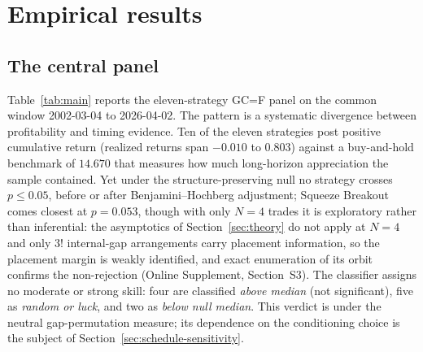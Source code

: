 \documentclass[risks,article,submit,pdftex,oneauthor]{Definitions/mdpi}
\begin{document}
\section{Empirical results}

\subsection{The central panel}

Table~\ref{tab:main} reports the eleven-strategy GC=F panel on the common window 2002-03-04 to 2026-04-02. The pattern is a systematic divergence between profitability and timing evidence. Ten of the eleven strategies post positive cumulative return (realized returns span $-0.010$ to $0.803$) against a buy-and-hold benchmark of $14.670$ that measures how much long-horizon appreciation the sample contained. Yet under the structure-preserving null no strategy crosses $p\le0.05$, before or after Benjamini--Hochberg adjustment; Squeeze Breakout comes closest at $p=0.053$, though with only $N=4$ trades it is exploratory rather than inferential: the asymptotics of Section~\ref{sec:theory} do not apply at $N=4$ and only $3!$ internal-gap arrangements carry placement information, so the placement margin is weakly identified, and exact enumeration of its orbit confirms the non-rejection (Online Supplement, Section~S3). The classifier assigns no moderate or strong skill: four are classified \emph{above median} (not significant), five as \emph{random or luck}, and two as \emph{below null median}. This verdict is under the neutral gap-permutation measure; its dependence on the conditioning choice is the subject of Section~\ref{sec:schedule-sensitivity}.
\end{document}
